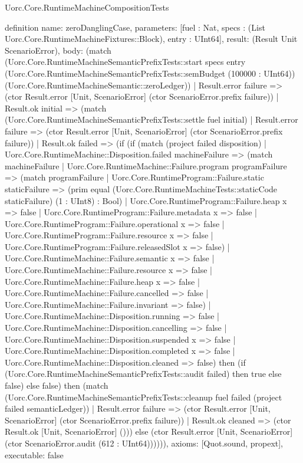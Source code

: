 \begin{lexlean}{Uorc.Core.RuntimeMachineCompositionTests}
\begin{semanticmodule}
definition{
  name: zeroDanglingCase,
  parameters: [fuel : Nat, specs : (List Uorc.Core.RuntimeMachineFixtures::Block), entry : UInt64],
  result: (Result Unit ScenarioError),
  body: (match (Uorc.Core.RuntimeMachineSemanticPrefixTests::start specs entry (Uorc.Core.RuntimeMachineSemanticPrefixTests::semBudget (100000 : UInt64)) (Uorc.Core.RuntimeMachineSemantic::zeroLedger))
    | Result.error failure => (ctor Result.error [Unit, ScenarioError] (ctor ScenarioError.prefix failure))
    | Result.ok initial => (match (Uorc.Core.RuntimeMachineSemanticPrefixTests::settle fuel initial)
      | Result.error failure => (ctor Result.error [Unit, ScenarioError] (ctor ScenarioError.prefix failure))
      | Result.ok failed => (if (if (match (project failed disposition)
        | Uorc.Core.RuntimeMachine::Disposition.failed machineFailure => (match machineFailure
          | Uorc.Core.RuntimeMachine::Failure.program programFailure => (match programFailure
            | Uorc.Core.RuntimeProgram::Failure.static staticFailure => (prim equal (Uorc.Core.RuntimeMachineTests::staticCode staticFailure) (1 : UInt8) : Bool)
            | Uorc.Core.RuntimeProgram::Failure.heap x => false
            | Uorc.Core.RuntimeProgram::Failure.metadata x => false
            | Uorc.Core.RuntimeProgram::Failure.operational x => false
            | Uorc.Core.RuntimeProgram::Failure.resource x => false
            | Uorc.Core.RuntimeProgram::Failure.releasedSlot x => false)
          | Uorc.Core.RuntimeMachine::Failure.semantic x => false
          | Uorc.Core.RuntimeMachine::Failure.resource x => false
          | Uorc.Core.RuntimeMachine::Failure.heap x => false
          | Uorc.Core.RuntimeMachine::Failure.cancelled => false
          | Uorc.Core.RuntimeMachine::Failure.invariant => false)
        | Uorc.Core.RuntimeMachine::Disposition.running => false
        | Uorc.Core.RuntimeMachine::Disposition.cancelling => false
        | Uorc.Core.RuntimeMachine::Disposition.suspended x => false
        | Uorc.Core.RuntimeMachine::Disposition.completed x => false
        | Uorc.Core.RuntimeMachine::Disposition.cleaned => false) then (if (Uorc.Core.RuntimeMachineSemanticPrefixTests::audit failed) then true else false) else false) then (match (Uorc.Core.RuntimeMachineSemanticPrefixTests::cleanup fuel failed (project failed semanticLedger))
        | Result.error failure => (ctor Result.error [Unit, ScenarioError] (ctor ScenarioError.prefix failure))
        | Result.ok cleaned => (ctor Result.ok [Unit, ScenarioError] ())) else (ctor Result.error [Unit, ScenarioError] (ctor ScenarioError.audit (612 : UInt64)))))),
  axioms: [Quot.sound, propext],
  executable: false
}


\end{semanticmodule}
\end{lexlean}
